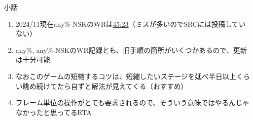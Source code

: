 \begin{\Columnname}{小話}
\begin{enumerate}[label={\sarrow}]
\tcbline*
\item 2024/11現在any\%-NSKのWRは\href{https://www.twitch.tv/videos/1689044910}{45:23}（ミスが多いのでSRCには投稿していない）
\item any\%, any\%-NSKのWR記録とも、旧手順の箇所がいくつかあるので、更新は十分可能

\tcbline*
\item なおこのゲームの短縮するコツは、短縮したいステージを延べ半日以上くらい眺め続けてたら自ずと解法が見えてくる（おすすめ）
\item フレーム単位の操作がとても要求されるので、そういう意味ではやるんじゃなかったと思ってるRTA
\end{enumerate}
\end{\Columnname}


\begin{appendices}
\end{appendices}


